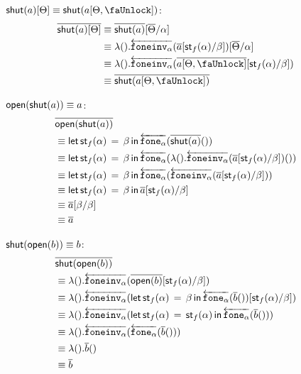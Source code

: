 \documentclass[10pt]{article}
\theoremstyle{definition}
\newcommand{\rewrite}[2]{\overleftarrow{#1}(#2)}
\newcommand\UE[2]{\ensuremath{#1(#2)}}
\newcommand\UI[2]{\ensuremath{\lambda #1.#2}}
\newcommand\StI[2]{\ensuremath{\mathsf{st}_{#1}(#2)}}
\newcommand\StE[4]{\ensuremath{\mathsf{let} \, \StI{#1}{#3} \, = \, {#2} \, \mathsf{in} \, #4}}
\begin{document}
\begin{enumerate}[style = multiline, labelwidth = 80pt]
\item[{$\RI{a}[\Theta] \equiv \RI{a[\Theta, \lock]}$}:] 
\begin{align*}
\upstairs{\RI{a}[\Theta]}
&\equiv \upstairs{\RI{a}}[\upstairs{\Theta}/\alpha] \\
&\equiv \UI{()}{\rewrite{\foneinv{\alpha}}{\upstairs{a}[\StI{f}{\alpha}/\beta]}}[\upstairs{\Theta}/\alpha] \\
&\equiv \UI{()}{\rewrite{\foneinv{\alpha}}{\upstairs{a[\Theta, \lock]}[\StI{f}{\alpha}/\beta]}} \\
&\equiv \upstairs{\RI{a[\Theta, \lock]}}
\end{align*}

\item[{$\mathsf{open}({\mathsf{shut}({a})}) \equiv a$}:] 
\begin{align*}
&\upstairs{\RE{\RI{a}}} \\
&\equiv \StE{f}{\beta}{\alpha}{\rewrite{\fone{\alpha}}{\UE{\upstairs{\RI{a}}}{}}} \\
&\equiv \StE{f}{\beta}{\alpha}{\rewrite{\fone{\alpha}}{\UE{\UI{()}{\rewrite{\foneinv{\alpha}}{\upstairs{a}[\StI{f}{\alpha}/\beta]}}}{}}} \\
&\equiv \StE{f}{\beta}{\alpha}{\rewrite{\fone{\alpha}}{\rewrite{\foneinv{\alpha}}{\upstairs{a}[\StI{f}{\alpha}/\beta]}}} \\
&\equiv \StE{f}{\beta}{\alpha}{\upstairs{a}[\StI{f}{\alpha}/\beta]} \\
&\equiv \upstairs{a}[\beta/\beta] \\
&\equiv \upstairs{a}
\end{align*}

\item[{$\mathsf{shut}({\mathsf{open}({b})}) \equiv b$}:] 
\begin{align*}
&\upstairs{\RI{\RE{b}}} \\
&\equiv \UI{()}{\rewrite{\foneinv{\alpha}}{\upstairs{\RE{b}}[\StI{f}{\alpha}/\beta]}} \\
&\equiv \UI{()}{\rewrite{\foneinv{\alpha}}{\StE{f}{\beta}{\alpha}{\rewrite{\fone{\alpha}}{\UE{\upstairs{b}}{}}}[\StI{f}{\alpha}/\beta]}} \\
&\equiv \UI{()}{\rewrite{\foneinv{\alpha}}{\StE{f}{\StI{f}{\alpha}}{\alpha}{\rewrite{\fone{\alpha}}{\UE{\upstairs{b}}{}}}}} \\
&\equiv \UI{()}{\rewrite{\foneinv{\alpha}}{\rewrite{\fone{\alpha}}{\UE{\upstairs{b}}{}}}} \\
&\equiv \UI{()}{\UE{\upstairs{b}}{}} \\
&\equiv \upstairs{b}
\end{align*}
\end{enumerate}
\end{document}
